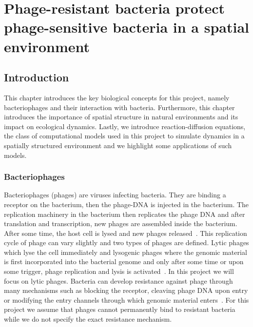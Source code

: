 \part{Phage-resistant bacteria protect phage-sensitive bacteria in a spatial environment}
\chapter{Introduction}
\label{chap:intro}

This chapter introduces the key biological concepts for this project, namely bacteriophages and their interaction with bacteria. Furthermore, this chapter introduces the importance of spatial structure in natural environments and its impact on ecological dynamics. Lastly, we introduce reaction-diffusion equations, the class of computational models used in this project to simulate dynamics in a spatially structured environment and we highlight some applications of such models.

\section{Bacteriophages}
Bacteriophages (phages) are viruses infecting bacteria. They are binding a receptor on the bacterium, then the phage-DNA is injected in the bacterium. The replication machinery in the bacterium then replicates the phage DNA and after translation and transcription, new phages are assembled inside the bacterium. After some time, the host cell is lysed and new phages released~\cite{Clokie2008-mc}. This replication cycle of phage can vary slightly and two types of phages are defined. Lytic phages which lyse the cell immediately and lysogenic phages where the genomic material is first incorporated into the bacterial genome and only after some time or upon some trigger, phage replication and lysis is activated~\cite{Young1992-nu, Howard-Varona2017-gi}. In this project we will focus on lytic phages. Bacteria can develop resistance against phage through many mechanisms such as blocking the receptor, cleaving phage DNA upon entry or modifying the entry channels through which genomic material enters~\cite{Labrie2010-rl}. For this project we assume that phages cannot permanently bind to resistant bacteria while we do not specify the exact resistance mechanism.

